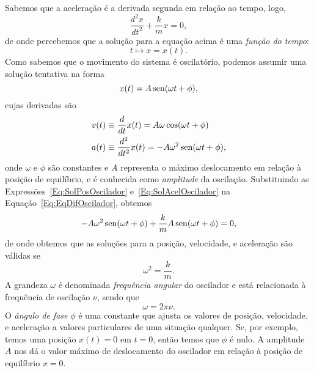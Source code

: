 Sabemos que a aceleração é a derivada segunda em relação ao tempo, logo,
\begin{equation}\label{Eq:EqDifOscilador}
    \frac{d^2x}{dt^2} + \frac{k}{m} x = 0,
\end{equation}
%
de onde percebemos que a solução para a equação acima é uma \emph{função do tempo}:
\begin{equation}
    t \mapsto x = x(t).
\end{equation}
%
Como sabemos que o movimento do sistema é oscilatório, podemos assumir uma solução tentativa na forma
\begin{equation}\label{Eq:SolPosOscilador}
    x(t) = A \operatorname{sen}(\omega t + \phi),
\end{equation}
%
cujas derivadas são
\begin{align}
    v(t) &\equiv \frac{d}{dt} x(t) = A \omega \cos(\omega t + \phi) \\
    a(t) &\equiv \frac{d^2}{dt^2} x(t) = -A \omega^2 \operatorname{sen}(\omega t + \phi), \label{Eq:SolAcelOscilador}
\end{align}
%
onde $\omega$ e $\phi$ são constantes e $A$ representa o máximo deslocamento em relação à posição de equilíbrio, e é conhecida como \emph{amplitude} da oscilação. Substituindo as Expressões~\eqref{Eq:SolPosOscilador} e~\eqref{Eq:SolAcelOscilador} na Equação~\eqref{Eq:EqDifOscilador}, obtemos
\begin{equation}
    -A \omega^2 \operatorname{sen}(\omega t + \phi) + \frac{k}{m} A \operatorname{sen}(\omega t + \phi) = 0,
\end{equation}
%
de onde obtemos que as soluções para a posição, velocidade, e aceleração são válidas se
\begin{equation}
    \omega^2 = \frac{k}{m}. \label{Eq:FrequenciaAngular}
\end{equation}
%
A grandeza $\omega$ é denominada \emph{frequência angular} do oscilador e está relacionada à frequência de oscilação $\nu$, sendo que
\begin{equation}
    \omega = 2\pi\nu.
\end{equation}
%
O \emph{ângulo de fase} $\phi$ é uma constante que ajusta os valores de posição, velocidade, e aceleração a valores particulares de uma situação qualquer. Se, por exemplo, temos uma posição $x(t) = 0$ em $t = 0$, então temos que $\phi$ é nulo. A amplitude $A$ nos dá o valor máximo de deslocamento do oscilador em relação à posição de equilíbrio $x = 0$.

